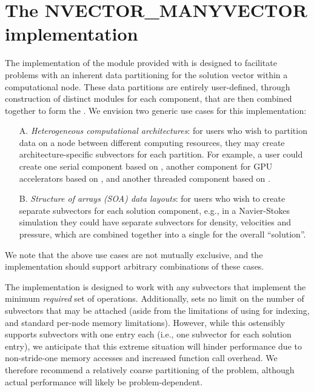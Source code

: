 %
\section{The NVECTOR\_MANYVECTOR implementation}\label{ss:nvec_manyvector}

The {\nvecmanyvector} implementation of the {\nvector} module provided
with {\sundials} is designed to facilitate problems with an inherent
data partitioning for the solution vector within a computational node.
These data partitions are entirely user-defined, through construction
of distinct {\nvector} modules for each component, that are then
combined together to form the {\nvecmanyvector}.  We envision two
generic use cases for this implementation:
\begin{itemize}
\item[A.] \emph{Heterogeneous computational architectures}: for users
  who wish to partition data on a node between different computing
  resources, they may create architecture-specific subvectors for each
  partition.  For example, a user could create one serial component
  based on {\nvecs}, another component for GPU accelerators based on
  {\nveccuda}, and another threaded component based on {\nvecopenmp}.
\item[B.] \emph{Structure of arrays (SOA) data layouts}: for users who
  wish to create separate subvectors for each solution component,
  e.g., in a Navier-Stokes simulation they could have separate
  subvectors for density, velocities and pressure, which are combined
  together into a single {\nvecmanyvector} for the overall ``solution''.
\end{itemize}
We note that the above use cases are not mutually exclusive, and the
{\nvecmanyvector} implementation should support arbitrary combinations
of these cases.

The {\nvecmanyvector} implementation is designed to
work with any {\nvector} subvectors that implement the minimum
\emph{required} set of operations.
Additionally, {\nvecmanyvector} sets no limit on the number of
subvectors that may be attached (aside from the limitations of using
 for indexing, and standard per-node memory
limitations).  However, while this ostensibly supports subvectors
with one entry each (i.e., one subvector for each solution entry), we
anticipate that this extreme situation will hinder performance due to
non-stride-one memory accesses and increased function call overhead.
We therefore recommend a relatively coarse partitioning of the
problem, although actual performance will likely be
problem-dependent.

